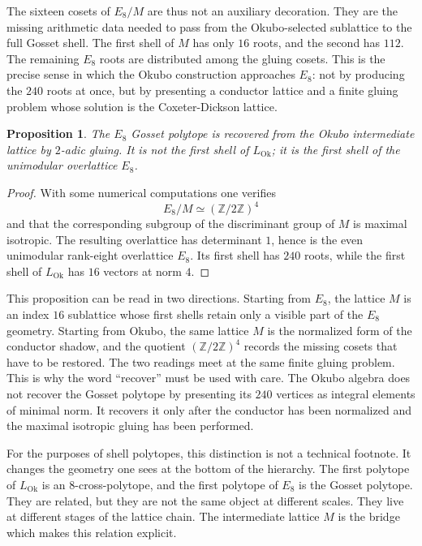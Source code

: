 \documentclass{birkjour}
\newtheorem{proposition}[theorem]{Proposition}
\newcommand{\LOk}{L_{\mathrm{Ok}}}
\newcommand{\ZZ}{\mathbb Z}
\numberwithin{equation}{section}
\begin{document}
The sixteen cosets of \(E_8/M\) are thus not an auxiliary decoration. They are
the missing arithmetic data needed to pass from the Okubo-selected sublattice
to the full Gosset shell. The first shell of \(M\) has only \(16\) roots, and
the second has \(112\). The remaining \(E_8\) roots are distributed among the
gluing cosets. This is the precise sense in which the Okubo construction
approaches \(E_8\): not by producing the \(240\) roots at once, but by
presenting a conductor lattice and a finite gluing problem whose solution is
the Coxeter-Dickson lattice.

\begin{proposition}
The \(E_8\) Gosset polytope is recovered from the Okubo intermediate lattice by
\(2\)-adic gluing. It is not the first shell of \(\LOk\); it is the first shell
of the unimodular overlattice \(E_8\).
\end{proposition}

\begin{proof}
With some numerical computations one verifies
\begin{equation}
E_8/M\simeq(\ZZ/2\ZZ)^4
\end{equation}
and that the corresponding subgroup of the discriminant group of \(M\) is
maximal isotropic. The resulting overlattice has determinant \(1\), hence is
the even unimodular rank-eight overlattice \(E_8\). Its first shell has \(240\)
roots, while the first shell of \(\LOk\) has \(16\) vectors at norm \(4\).
\end{proof}

This proposition can be read in two directions. Starting from \(E_8\), the
lattice \(M\) is an index \(16\) sublattice whose first shells retain only a
visible part of the \(E_8\) geometry. Starting from Okubo, the same lattice
\(M\) is the normalized form of the conductor shadow, and the quotient
\((\ZZ/2\ZZ)^4\) records the missing cosets that have to be restored. The two
readings meet at the same finite gluing problem. This is why the word
``recover'' must be used with care. The Okubo algebra does not recover the
Gosset polytope by presenting its \(240\) vertices as integral elements of
minimal norm. It recovers it only after the conductor has been normalized and
the maximal isotropic gluing has been performed.

For the purposes of shell polytopes, this distinction is not a technical
footnote. It changes the geometry one sees at the bottom of the hierarchy. The
first polytope of \(\LOk\) is an \(8\)-cross-polytope, and the first polytope
of \(E_8\) is the Gosset polytope. They are related, but they are not the same
object at different scales. They live at different stages of the lattice
chain. The intermediate lattice \(M\) is the bridge which makes this relation
explicit.
\end{document}
